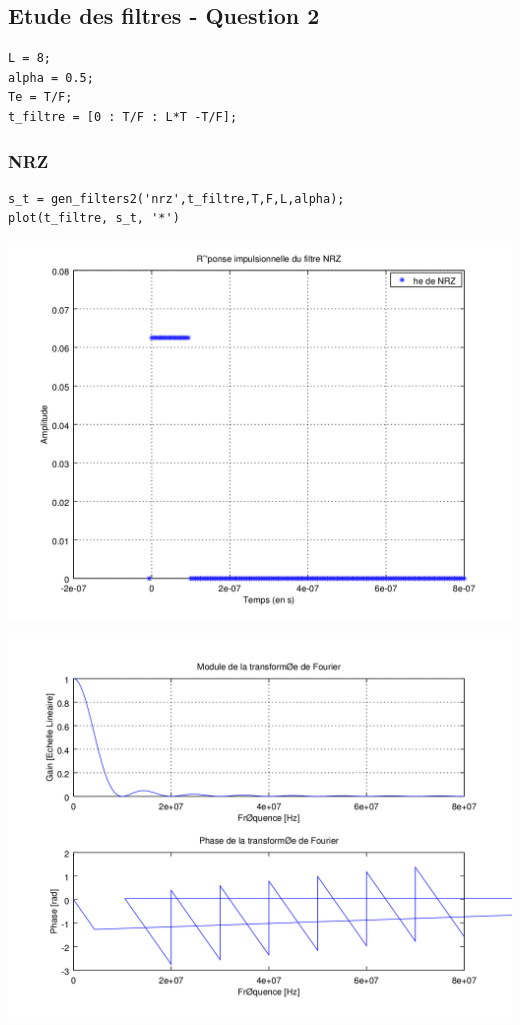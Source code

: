 \documentclass{acm_proc_article-sp}
\begin{document}
\subsection{Etude des filtres - Question 2}

\begin{lstlisting}
L = 8;
alpha = 0.5;
Te = T/F;
t_filtre = [0 : T/F : L*T -T/F];
\end{lstlisting}

\subsubsection{NRZ}

\begin{lstlisting}
s_t = gen_filters2('nrz',t_filtre,T,F,L,alpha);
plot(t_filtre, s_t, '*')
\end{lstlisting}

\begin{center}
\includegraphics[scale=0.45]{NRZ_3.png}
\end{center}

\begin{center}
\includegraphics[scale=0.45]{NRZ_rep_3.png}
\end{center}
\end{document}
